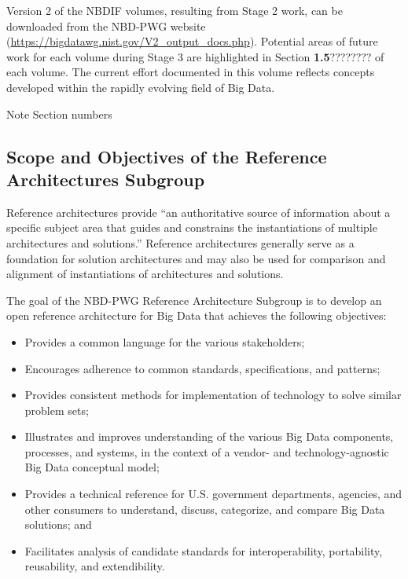 \documentclass[9pt,]{article}
\newenvironment{Shaded}{}{}
\newcommand{\ExtensionTok}[1]{#1}
\newcommand{\NormalTok}[1]{#1}
\providecommand{\tightlist}{%
  \setlength{\itemsep}{0pt}\setlength{\parskip}{0pt}}
\begin{document}
Version 2 of the NBDIF volumes, resulting from Stage 2 work, can be
downloaded from the NBD-PWG website
(\url{https://bigdatawg.nist.gov/V2_output_docs.php}). Potential areas
of future work for each volume during Stage 3 are highlighted in Section
\textbf{1.5}???????? of each volume. The current effort documented in
this volume reflects concepts developed within the rapidly evolving
field of Big Data.

\begin{Shaded}
\begin{Highlighting}[]
\ExtensionTok{Note}\NormalTok{ Section numbers}
\end{Highlighting}
\end{Shaded}

\hypertarget{scope-and-objectives-of-the-reference-architectures-subgroup}{%
\subsection{Scope and Objectives of the Reference Architectures
Subgroup}\label{scope-and-objectives-of-the-reference-architectures-subgroup}}

Reference architectures provide ``an authoritative source of information
about a specific subject area that guides and constrains the
instantiations of multiple architectures and solutions.'' Reference
architectures generally serve as a foundation for solution architectures
and may also be used for comparison and alignment of instantiations of
architectures and solutions.

The goal of the NBD-PWG Reference Architecture Subgroup is to develop an
open reference architecture for Big Data that achieves the following
objectives:

\begin{itemize}
\tightlist
\item
  Provides a common language for the various stakeholders;
\item
  Encourages adherence to common standards, specifications, and
  patterns;
\item
  Provides consistent methods for implementation of technology to solve
  similar problem sets;
\item
  Illustrates and improves understanding of the various Big Data
  components, processes, and systems, in the context of a vendor- and
  technology-agnostic Big Data conceptual model;
\item
  Provides a technical reference for U.S. government departments,
  agencies, and other consumers to understand, discuss, categorize, and
  compare Big Data solutions; and
\item
  Facilitates analysis of candidate standards for interoperability,
  portability, reusability, and extendibility.
\end{itemize}
\end{document}
